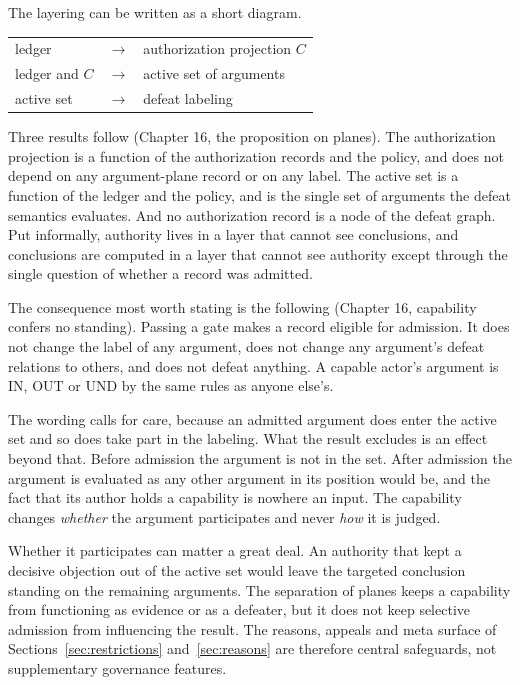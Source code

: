 \documentclass[11pt]{article}
\newcommand{\IN}{\textsf{IN}}
\newcommand{\UND}{\textsf{UND}}
\newcommand{\OUT}{\textsf{OUT}}
\begin{document}
The layering can be written as a short diagram.
\begin{center}
\small
\begin{tabular}{@{}l@{\;}c@{\;}l@{}}
ledger & $\longrightarrow$ & authorization projection $C$\\
ledger and $C$ & $\longrightarrow$ & active set of arguments\\
active set & $\longrightarrow$ & defeat labeling
\end{tabular}
\end{center}

Three results follow (Chapter 16, the proposition on planes). The authorization projection is a function of the authorization records and the policy, and does not depend on any argument-plane record or on any label. The active set is a function of the ledger and the policy, and is the single set of arguments the defeat semantics evaluates. And no authorization record is a node of the defeat graph. Put informally, authority lives in a layer that cannot see conclusions, and conclusions are computed in a layer that cannot see authority except through the single question of whether a record was admitted.

The consequence most worth stating is the following (Chapter 16, capability confers no standing). Passing a gate makes a record eligible for admission. It does not change the label of any argument, does not change any argument's defeat relations to others, and does not defeat anything. A capable actor's argument is \IN{}, \OUT{} or \UND{} by the same rules as anyone else's.

The wording calls for care, because an admitted argument does enter the active set and so does take part in the labeling. What the result excludes is an effect beyond that. Before admission the argument is not in the set. After admission the argument is evaluated as any other argument in its position would be, and the fact that its author holds a capability is nowhere an input. The capability changes \emph{whether} the argument participates and never \emph{how} it is judged.

Whether it participates can matter a great deal. An authority that kept a
decisive objection out of the active set would leave the targeted
conclusion standing on the remaining arguments. The separation of planes
keeps a capability from functioning as evidence or as a defeater, but it
does not keep selective admission from influencing the result. The
reasons, appeals and meta surface of Sections~\ref{sec:restrictions}
and~\ref{sec:reasons} are therefore central safeguards, not supplementary
governance features.
\end{document}
